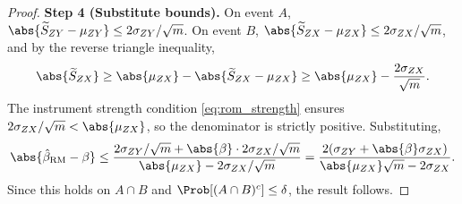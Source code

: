\begin{proof}
\medskip\noindent\textbf{Step 4 (Substitute bounds).} On event $A$, $\abs{\widetilde{S}_{ZY} - \mu_{ZY}} \leq 2\sigma_{ZY}/\sqrt{m}$. On event $B$, $\abs{\widetilde{S}_{ZX} - \mu_{ZX}} \leq 2\sigma_{ZX}/\sqrt{m}$, and by the reverse triangle inequality,
\[
    \abs{\widetilde{S}_{ZX}} \geq \abs{\mu_{ZX}} - \abs{\widetilde{S}_{ZX} - \mu_{ZX}} \geq \abs{\mu_{ZX}} - \frac{2\sigma_{ZX}}{\sqrt{m}}.
\]
The instrument strength condition \eqref{eq:rom_strength} ensures $2\sigma_{ZX}/\sqrt{m} < \abs{\mu_{ZX}}$, so the denominator is strictly positive. Substituting,
\[
    \abs{\hat{\beta}_{\mathrm{RM}} - \beta} \leq \frac{2\sigma_{ZY}/\sqrt{m} + \abs{\beta}\cdot 2\sigma_{ZX}/\sqrt{m}}{\abs{\mu_{ZX}} - 2\sigma_{ZX}/\sqrt{m}} = \frac{2(\sigma_{ZY} + \abs{\beta}\sigma_{ZX})}{\abs{\mu_{ZX}}\sqrt{m} - 2\sigma_{ZX}}.
\]
Since this holds on $A \cap B$ and $\Prob[(A \cap B)^c] \leq \delta$, the result follows.
\end{proof}